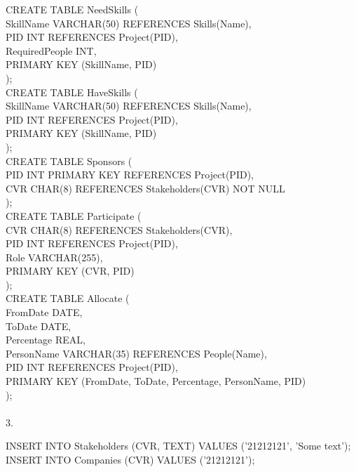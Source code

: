 \documentclass[12pt]{article}
\begin{document}
{CREATE TABLE NeedSkills (\\
  SkillName VARCHAR(50) REFERENCES Skills(Name),\\
  PID INT REFERENCES Project(PID),\\
  RequiredPeople INT,\\
  PRIMARY KEY (SkillName, PID)\\
);\\

CREATE TABLE HaveSkills (\\
  SkillName VARCHAR(50) REFERENCES Skills(Name),\\
  PID INT REFERENCES Project(PID),\\
  PRIMARY KEY (SkillName, PID)\\
);\\

CREATE TABLE Sponsors (\\
  PID INT PRIMARY KEY REFERENCES Project(PID),\\
  CVR CHAR(8) REFERENCES Stakeholders(CVR) NOT NULL\\
);\\

CREATE TABLE Participate (\\
  CVR CHAR(8) REFERENCES Stakeholders(CVR),\\
  PID INT REFERENCES Project(PID),\\
  Role VARCHAR(255),\\
  PRIMARY KEY (CVR, PID)\\
);\\

CREATE TABLE Allocate (\\
  FromDate DATE,\\
  ToDate DATE,\\
  Percentage REAL,\\
  PersonName VARCHAR(35) REFERENCES People(Name),\\
  PID INT REFERENCES Project(PID),\\
  PRIMARY KEY (FromDate, ToDate, Percentage, PersonName, PID)\\
);\\
\\

3.

INSERT INTO Stakeholders (CVR, TEXT) VALUES ('21212121', 'Some text');\\

INSERT INTO Companies (CVR) VALUES ('21212121');\\

}
\end{document}
